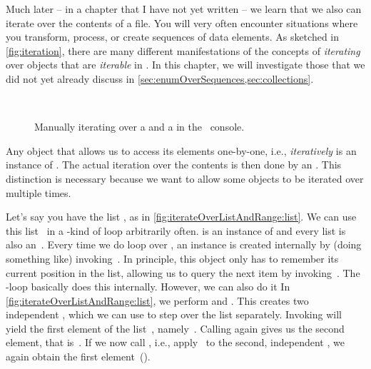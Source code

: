 Much later -- in a chapter that I have not yet written -- we learn that we also can iterate over the contents of a file.
You will very often encounter situations where you transform, process, or create sequences of data elements.
As sketched in \cref{fig:iteration}, there are many different manifestations of the concepts of \emph{iterating} over objects that are \emph{iterable} in \python.
In this chapter, we will investigate those that we did not yet already discuss in \cref{sec:enumOverSequences,sec:collections}.
%
%
\label{sec:iterable}%
%
\begin{figure}%
\centering%
%
%
%
\\[12pt]%
%
%
%
%
\caption{Manually iterating over a  and a  in the \python~console.}%
\label{fig:iterateOverListAndRange}%
\end{figure}%
%
\begin{sloppypar}%
Any object that allows us to access its elements one-by-one, i.e., \emph{iteratively} is an instance of .
The actual iteration over the contents is then done by an .
This distinction is necessary because we want to allow some objects to be iterated over multiple times.%
\end{sloppypar}%
%
Let's say you have the list , as in \cref{fig:iterateOverListAndRange:list}.
We can use this list~ in a -kind of loop arbitrarily often.
 is an instance of  and every list is also an~.
Every time we do loop over , an  instance is created internally by (doing something like) invoking~.
In principle, this  object only has to remember its current position in the list, allowing us to query the next item by invoking~.
The -loop basically does this internally.
However, we can also do it 
In \cref{fig:iterateOverListAndRange:list}, we perform  and .
This creates two independent , which we can use to step over the list separately.
Invoking  will yield the first element of the list~, namely~.
Calling  again gives us the second element, that is~.
If we now call , i.e., apply~ to the second, independent , we again obtain the first element~().

